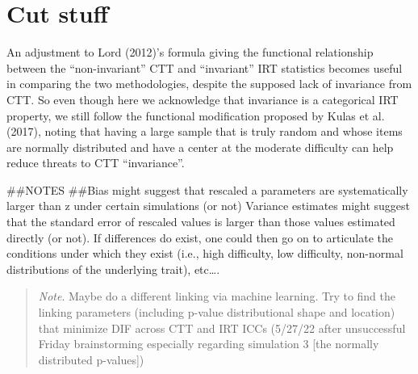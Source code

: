 \documentclass[
  man]{apa6}
\begin{document}
\endgroup

\hypertarget{appendix-appendices}{%
\appendix}


\hypertarget{cut-stuff}{%
\section{Cut stuff}\label{cut-stuff}}

An adjustment to Lord (2012)'s formula giving the functional relationship between the ``non-invariant'' CTT and ``invariant'' IRT statistics becomes useful in comparing the two methodologies, despite the supposed lack of invariance from CTT. So even though here we acknowledge that invariance is a categorical IRT property, we still follow the functional modification proposed by Kulas et al. (2017), noting that having a large sample that is truly random and whose items are normally distributed and have a center at the moderate difficulty can help reduce threats to CTT ``invariance''.

\#\#NOTES
\#\#Bias might suggest that rescaled a parameters are systematically larger than z under certain simulations (or not) Variance estimates might suggest that the standard error of rescaled values is larger than those values estimated directly (or not). If differences do exist, one could then go on to articulate the conditions under which they exist (i.e., high difficulty, low difficulty, non-normal distributions of the underlying trait), etc\ldots.

\begin{quote}
\emph{Note}. Maybe do a different linking via machine learning. Try to find the linking parameters (including p-value distributional shape and location) that minimize DIF across CTT and IRT ICCs (5/27/22 after unsuccessful Friday brainstorming especially regarding simulation 3 {[}the normally distributed p-values{]})
\end{quote}
\end{document}
